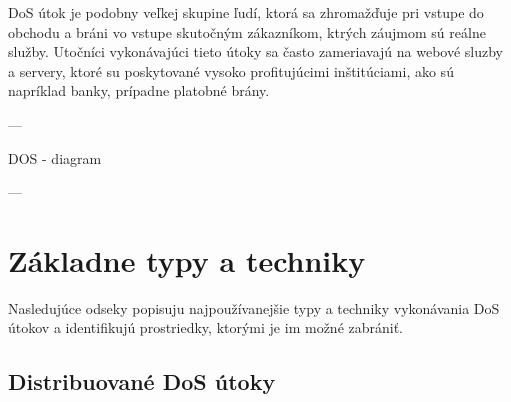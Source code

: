 \documentclass[
  printed, %
  table,   %
  lof,     %
  lot,     %
]{fithesis3}
\begin{document}
DoS útok je podobny veľkej skupine ľudí, ktorá sa zhromažďuje pri vstupe do obchodu a
bráni vo vstupe skutočným zákazníkom, ktrých záujmom sú reálne služby.
Utočníci vykonávajúci tieto útoky sa často zameriavajú na webové sluzby a servery,
ktoré su poskytované vysoko profitujúcimi inštitúciami, ako sú napríklad banky,
prípadne platobné brány.

---

DOS - diagram

---

\section{Základne typy a techniky}
Nasledujúce odseky popisuju najpoužívanejšie typy a techniky vykonávania DoS útokov a
identifikujú prostriedky, ktorými je im možné zabrániť.

\subsection{Distribuované DoS útoky}

\end{document}
